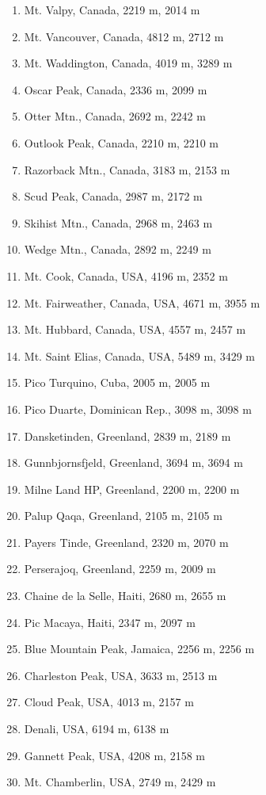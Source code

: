 \documentclass[10pt,twocolumn,letterpaper]{article}
\begin{document}
\begin{flushleft}
\begin{enumerate}
    \item Mt. Valpy, Canada, 2219 m, 2014 m
    \item Mt. Vancouver, Canada, 4812 m, 2712 m
    \item Mt. Waddington, Canada, 4019 m, 3289 m
    \item Oscar Peak, Canada, 2336 m, 2099 m
    \item Otter Mtn., Canada, 2692 m, 2242 m
    \item Outlook Peak, Canada, 2210 m, 2210 m
    \item Razorback Mtn., Canada, 3183 m, 2153 m
    \item Scud Peak, Canada, 2987 m, 2172 m
    \item Skihist Mtn., Canada, 2968 m, 2463 m
    \item Wedge Mtn., Canada, 2892 m, 2249 m
    \item Mt. Cook, Canada, USA, 4196 m, 2352 m
    \item Mt. Fairweather, Canada, USA, 4671 m, 3955 m
    \item Mt. Hubbard, Canada, USA, 4557 m, 2457 m
    \item Mt. Saint Elias, Canada, USA, 5489 m, 3429 m
    \item Pico Turquino, Cuba, 2005 m, 2005 m
    \item Pico Duarte, Dominican Rep., 3098 m, 3098 m
    \item Dansketinden, Greenland, 2839 m, 2189 m
    \item Gunnbjornsfjeld, Greenland, 3694 m, 3694 m
    \item Milne Land HP, Greenland, 2200 m, 2200 m
    \item Palup Qaqa, Greenland, 2105 m, 2105 m
    \item Payers Tinde, Greenland, 2320 m, 2070 m
    \item Perserajoq, Greenland, 2259 m, 2009 m
    \item Chaine de la Selle, Haiti, 2680 m, 2655 m
    \item Pic Macaya, Haiti, 2347 m, 2097 m
    \item Blue Mountain Peak, Jamaica, 2256 m, 2256 m
    \item Charleston Peak, USA, 3633 m, 2513 m
    \item Cloud Peak, USA, 4013 m, 2157 m
    \item Denali, USA, 6194 m, 6138 m
    \item Gannett Peak, USA, 4208 m, 2158 m
    \item Mt. Chamberlin, USA, 2749 m, 2429 m

\end{enumerate}
\end{flushleft}
\end{document}
